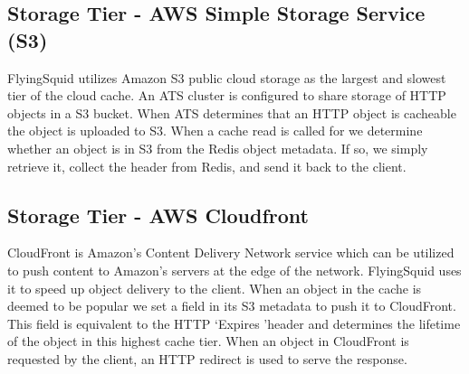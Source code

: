 \subsection{Storage Tier - AWS Simple Storage Service (S3)}
FlyingSquid utilizes Amazon S3 public cloud storage as the largest and slowest tier of the cloud cache. An ATS cluster is configured to share storage of HTTP objects in a S3 bucket. When ATS determines that an HTTP object is cacheable the object is uploaded to S3. When a cache read is called for we determine whether an object is in S3 from the Redis object metadata. If so, we simply retrieve it, collect the header from Redis, and send it back to the client.

\subsection{Storage Tier - AWS Cloudfront}
CloudFront is Amazon's Content Delivery Network service which can be utilized to push content to Amazon's servers at the edge of the network. FlyingSquid uses it to speed up object delivery to the client. When an object in the cache is deemed to be popular we set a field in its S3 metadata to push it to CloudFront. This field is equivalent to the HTTP \lq Expires \rq header and determines the lifetime of the object in this highest cache tier. When an object in CloudFront is requested by the client, an HTTP redirect is used to serve the response.
